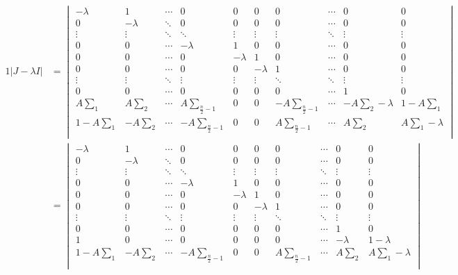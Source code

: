 \begingroup
\small
\begin{alignat}{1}
|J-\lambda I| &=\begin{vmatrix} 
-\lambda  & 1 & \cdots & 0 & 0 & 0 & 0 & \cdots & 0 & 0\\ 
0  & -\lambda  & \ddots & 0 & 0 & 0 & 0 & \cdots & 0 & 0\\  
\vdots & \vdots & \ddots & \ddots & \vdots & \vdots & \vdots & \ddots & \vdots & \vdots\\
0  & 0  & \cdots & -\lambda & 1 & 0 & 0 & \cdots & 0 & 0\\  
0  & 0  & \cdots & 0 & -\lambda & 1 & 0 & \cdots & 0 & 0\\  
0  & 0  & \cdots & 0 & 0 & -\lambda & 1 & \cdots & 0 & 0\\  
\vdots & \vdots & \ddots & \vdots & \vdots & \vdots & \ddots & \ddots & \vdots & \vdots\\
0  & 0  & \cdots & 0 & 0 & 0 & 0 & \cdots & 1 & 0 \\ 
A\sum\limits_{1} & A\sum\limits_{2} & \cdots &  A\sum\limits_{\frac{n}{2}-1} & 0 & 0 & -A\sum\limits_{\frac{n}{2}-1}& \cdots & -A\sum\limits_{2}-\lambda & 1-A\sum\limits_{1} \\  
1-A\sum\limits_{1} & -A\sum\limits_{2} & \cdots &  -A\sum\limits_{\frac{n}{2}-1} & 0 & 0 &  A\sum\limits_{\frac{n}{2}-1}& \cdots & A\sum\limits_{2} & A\sum\limits_{1}-\lambda \\  
\end{vmatrix} \\
&=\begin{vmatrix} 
-\lambda  & 1  & \cdots & 0 & 0 & 0 & 0 & \cdots & 0 & 0\\ 
0  & -\lambda  & \ddots & 0 & 0 & 0 & 0 & \cdots & 0 & 0\\  
\vdots & \vdots & \ddots & \ddots & \vdots & \vdots & \vdots & \ddots & \vdots & \vdots\\
0  & 0  & \cdots & -\lambda & 1 & 0 & 0 & \cdots & 0 & 0\\  
0  & 0  & \cdots & 0 & -\lambda & 1 & 0 & \cdots & 0 & 0\\  
0  & 0  & \cdots & 0 & 0 & -\lambda & 1 & \cdots & 0 & 0\\  
\vdots & \vdots & \ddots & \vdots & \vdots & \vdots & \ddots & \ddots & \vdots & \vdots\\
0  & 0  & \cdots & 0 & 0 & 0 & 0 & \cdots & 1 & 0 \\ 
1 & 0 & \cdots &  0 & 0 & 0 & 0 & \cdots & -\lambda & 1-\lambda \\  
1-A\sum\limits_{1} & -A\sum\limits_{2} & \cdots &  -A\sum\limits_{\frac{n}{2}-1} & 0 & 0 &  A\sum\limits_{\frac{n}{2}-1}& \cdots & A\sum\limits_{2} & A\sum\limits_{1}-\lambda \\  

\end{vmatrix}
\end{alignat}
